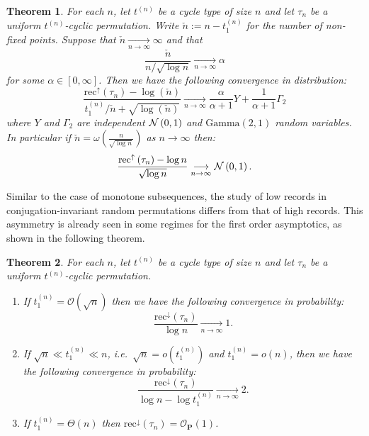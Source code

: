 \documentclass{article}
\newtheorem{theorem}{Theorem}[section]
\theoremstyle{remark}
\newcommand{\cv}[2]{\underset{#1\to#2}{\longrightarrow}}
\def\O{\mathcal{O}}
\def\P{\mathbf{P}}
\newcommand{\Gam}[2]{\mathrm{Gamma}\left(#1 , #2\right)}
\newcommand{\Normal}[2]{{\cal N}\left(#1 , #2\right)}
\newcommand{\hrec}[1]{\mathrm{rec}^\uparrow\left(#1\right)}
\newcommand{\lrec}[1]{\mathrm{rec}^\downarrow\left(#1\right)}
\begin{document}
\begin{theorem}\label{th: high records t-cyclic}
    For each $n$, let $t^{(n)}$ be a cycle type of size $n$ and let $\tau_n$ be a uniform $t^{(n)}$-cyclic permutation.
    Write $\check n := n-t_1^{(n)}$ for the number of non-fixed points.
    Suppose that $\check n \cv{n}{\infty} \infty$ and that
    \begin{equation*}
        \frac{\check n}{n/\sqrt{\log n}} \cv{n}{\infty} \alpha
    \end{equation*}
    for some $\alpha\in[0,\infty]$.
    Then we have the following convergence in distribution:
    \begin{equation*}
        \frac{\hrec{\tau_n} - \log\left(\check n\right)}{t_1^{(n)}/\check n + \sqrt{\log\left(\check n\right)}}
        \cv{n}{\infty}
        \frac{\alpha}{\alpha+1} Y
        + \frac{1}{\alpha+1} \Gamma_2
    \end{equation*}
    where $Y$ and $\Gamma_2$ are independent $\Normal{0}{1}$ and $\Gam{2}{1}$ random variables.
    In particular if $\check n = \omega\left(\frac{n}{\sqrt{\log n}}\right)$ as $n\to\infty$ then:
    \begin{equation*}
        \frac{\hrec{\tau_n} - \log n}{\sqrt{\log n}}
        \cv{n}{\infty}
        \Normal{0}{1} .
    \end{equation*}
\end{theorem}

Similar to the case of monotone subsequences, the study of low records in conjugation-invariant random permutations differs from that of high records.
This asymmetry is already seen in some regimes for the first order asymptotics, as shown in the following theorem.

\begin{theorem}\label{th: low records t-cyclic}
    For each $n$, let $t^{(n)}$ be a cycle type of size $n$ and let $\tau_n$ be a uniform $t^{(n)}$-cyclic permutation.
    \begin{enumerate}
        \item If $t_1^{(n)} = \O\left(\sqrt n\right)$ then we have the following convergence in probability:
        \begin{equation*}
            \frac{\lrec{\tau_n}}{\log n} \cv{n}{\infty} 1 .
        \end{equation*}
        \item If $\sqrt n \ll t_1^{(n)} \ll n$, i.e.~$\sqrt n = o\left( t_1^{(n)} \right)$ and $t_1^{(n)} = o(n)$, then we have the following convergence in probability:
        \begin{equation*}
            \frac{\lrec{\tau_n}}{\log n - \log t_1^{(n)}} \cv{n}{\infty} 2 .
        \end{equation*}
        \item If $t_1^{(n)}=\Theta\left( n \right)$ then $\lrec{\tau_n} = \O_\P(1)$.
    \end{enumerate}
\end{theorem}
\end{document}
